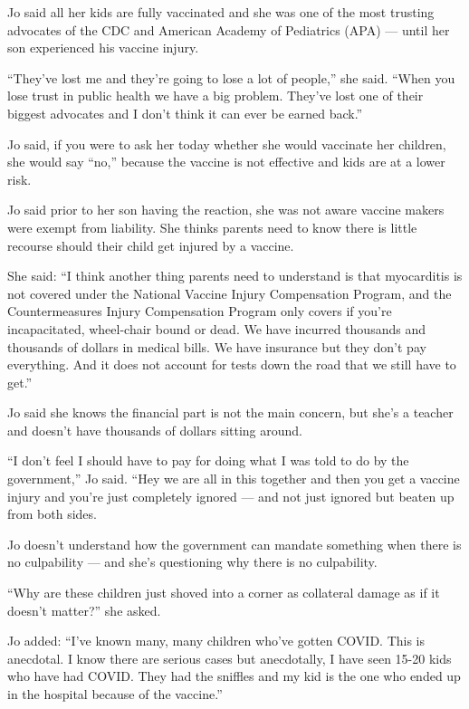 Jo said all her kids are fully vaccinated and she was one of the most trusting
advocates of the CDC and American Academy of Pediatrics (APA) — until her son
experienced his vaccine injury.

“They’ve lost me and they’re going to lose a lot of people,” she said. “When you
lose trust in public health we have a big problem. They’ve lost one of their
biggest advocates and I don’t think it can ever be earned back.”

Jo said, if you were to ask her today whether she would vaccinate her children,
she would say “no,” because the vaccine is not effective and kids are at a lower
risk.

Jo said prior to her son having the reaction, she was not aware vaccine makers
were exempt from liability. She thinks parents need to know there is little
recourse should their child get injured by a vaccine.

She said: “I think another thing parents need to understand is that myocarditis
is not covered under the National Vaccine Injury Compensation Program, and the
Countermeasures Injury Compensation Program only covers if you’re incapacitated,
wheel-chair bound or dead. We have incurred thousands and thousands of dollars
in medical bills. We have insurance but they don’t pay everything. And it does
not account for tests down the road that we still have to get.”

Jo said she knows the financial part is not the main concern, but she’s a
teacher and doesn’t have thousands of dollars sitting around.

“I don’t feel I should have to pay for doing what I was told to do by the
government,” Jo said. “Hey we are all in this together and then you get a
vaccine injury and you’re just completely ignored — and not just ignored but
beaten up from both sides.

Jo doesn’t understand how the government can mandate something when there is no
culpability — and she’s questioning why there is no culpability.

“Why are these children just shoved into a corner as collateral damage as if it
doesn’t matter?” she asked.

Jo added: “I’ve known many, many children who’ve gotten COVID. This is
anecdotal. I know there are serious cases but anecdotally, I have seen 15-20
kids who have had COVID. They had the sniffles and my kid is the one who ended
up in the hospital because of the vaccine.”

